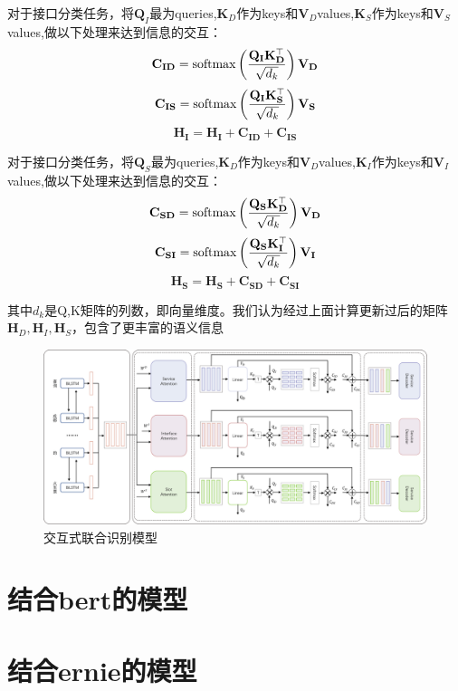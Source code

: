 对于接口分类任务，将$\mathbf{Q}_{I}$最为queries,$\mathbf{K}_{D}$作为keys和$\mathbf{V}_{D}$values,$\mathbf{K}_{S}$作为keys和$\mathbf{V}_{S}$values,做以下处理来达到信息的交互：
\begin{equation}
  \mathbf{C}_{\mathbf{ID}}=\operatorname{softmax}\left(\frac{\mathbf{Q}_{\mathbf{I}} \mathbf{K}_{\mathbf{D}}^{\top}}{\sqrt{d_{k}}}\right) \mathbf{V}_{\mathbf{D}}\\
\end{equation}
\begin{equation}
  \mathbf{C}_{\mathbf{IS}}=\operatorname{softmax}\left(\frac{\mathbf{Q}_{\mathbf{I}} \mathbf{K}_{\mathbf{S}}^{\top}}{\sqrt{d_{k}}}\right) \mathbf{V}_{\mathbf{S}}\\
\end{equation}
\begin{equation}
  \mathbf{H}_\mathbf{I}=\mathbf{H}_\mathbf{I}+\mathbf{C}_{\mathbf{ID}}+\mathbf{C}_{\mathbf{IS}}
\end{equation}

对于接口分类任务，将$\mathbf{Q}_{S}$最为queries,$\mathbf{K}_{D}$作为keys和$\mathbf{V}_{D}$values,$\mathbf{K}_{I}$作为keys和$\mathbf{V}_{I}$values,做以下处理来达到信息的交互：
\begin{equation}
  \mathbf{C}_{\mathbf{SD}}=\operatorname{softmax}\left(\frac{\mathbf{Q}_{\mathbf{S}} \mathbf{K}_{\mathbf{D}}^{\top}}{\sqrt{d_{k}}}\right) \mathbf{V}_{\mathbf{D}}\\
\end{equation}
\begin{equation}
  \mathbf{C}_{\mathbf{SI}}=\operatorname{softmax}\left(\frac{\mathbf{Q}_{\mathbf{S}} \mathbf{K}_{\mathbf{I}}^{\top}}{\sqrt{d_{k}}}\right) \mathbf{V}_{\mathbf{I}}\\
\end{equation}
\begin{equation}
  \mathbf{H}_\mathbf{S}=\mathbf{H}_\mathbf{S}+\mathbf{C}_{\mathbf{SD}}+\mathbf{C}_{\mathbf{SI}}
\end{equation}

其中$d_k$是Q,K矩阵的列数，即向量维度。我们认为经过上面计算更新过后的矩阵$\mathbf{H}_{D},\mathbf{H}_{I},\mathbf{H}_{S}$，包含了更丰富的语义信息

\begin{figure}[htbp]
  \centering
  \includegraphics[width=18cm]{./images/co-interactive.jpg}
  \caption{交互式联合识别模型}
  \label{fig:lianhe2}
\end{figure}

\section{结合bert的模型}

\section{结合ernie的模型}

